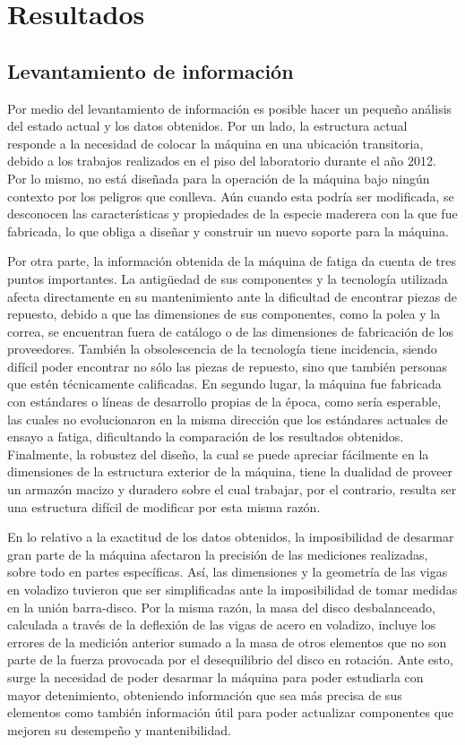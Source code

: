 \chapter{Resultados}

\section{Levantamiento de información}
Por medio del levantamiento de información es posible hacer un pequeño análisis del estado actual y los datos obtenidos. Por un lado, la estructura actual responde a la necesidad de colocar la máquina en una ubicación transitoria, debido a los trabajos realizados en el piso del laboratorio durante el año 2012. Por lo mismo, no está diseñada para la operación de la máquina bajo ningún contexto por los peligros que conlleva. Aún cuando esta podría ser modificada, se desconocen las características y propiedades de la especie maderera con la que fue fabricada, lo que obliga a diseñar y construir un nuevo soporte para la máquina. 

Por otra parte, la información obtenida de la máquina de fatiga da cuenta de tres puntos importantes. La antigüedad de sus componentes y la tecnología utilizada afecta directamente en su mantenimiento ante la dificultad de encontrar piezas de repuesto, debido a que las dimensiones de sus componentes, como la polea y la correa, se encuentran fuera de catálogo o de las dimensiones de fabricación de los proveedores. También la obsolescencia de la tecnología tiene incidencia, siendo difícil poder encontrar no sólo las piezas de repuesto, sino que también personas que estén técnicamente calificadas. En segundo lugar, la máquina fue fabricada con estándares o líneas de desarrollo propias de la época, como sería esperable, las cuales no evolucionaron en la misma dirección que los estándares actuales de ensayo a fatiga, dificultando la comparación de los resultados obtenidos. Finalmente, la robustez del diseño, la cual se puede apreciar fácilmente en la dimensiones de la estructura exterior de la máquina, tiene la dualidad de proveer un armazón macizo y duradero sobre el cual trabajar, por el contrario, resulta ser una estructura difícil de modificar por esta misma razón.

En lo relativo a la exactitud de los datos obtenidos, la imposibilidad de desarmar gran parte de la máquina afectaron la precisión de las mediciones realizadas, sobre todo en partes específicas. Así, las dimensiones y la geometría de las vigas en voladizo tuvieron que ser simplificadas ante la imposibilidad de tomar medidas en la unión barra-disco. Por la misma razón, la masa del disco desbalanceado, calculada a través de la deflexión de las vigas de acero en voladizo, incluye los errores de la medición anterior sumado a la masa de otros elementos que no son parte de la fuerza provocada por el desequilibrio del disco en rotación. Ante esto, surge la necesidad de poder desarmar la máquina para poder estudiarla con mayor detenimiento, obteniendo información que sea más precisa de sus elementos como también información útil para poder actualizar componentes que mejoren su desempeño y mantenibilidad. 
 
